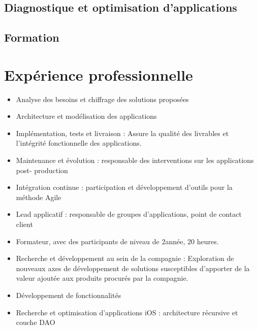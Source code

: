 \documentclass[a4paper,11pt]{moderncv}
\begin{document}
\subsection{Diagnostique et optimisation d’applications}

\subsection{Formation}

\section{Expérience professionnelle}

{}{}{}{
\begin{itemize}
	\item Analyse des besoins et chiffrage des solutions proposées
	\item Architecture et modélisation des applications
	\item Implémentation, tests et livraison : Assure la qualité des livrables et l’intégrité
fonctionnelle des applications.
	\item Maintenance et évolution : responsable des interventions sur les applications post-
production
	\item Intégration continue : participation et développement d’outils pour la méthode Agile
	\item Lead applicatif : responsable de groupes d’applications, point de contact client
	\item Formateur, avec des participants de niveau de 2\ieme année, 20 heures.
	\item Recherche et développement au sein de la compagnie : Exploration de nouveaux axes de développement de solutions susceptibles d’apporter de la valeur ajoutée aux produits
procurés par la compagnie.
\end{itemize}
}

{}{}{}{
\begin{itemize}
	\item Développement de fonctionnalités
	\item Recherche et optimisation d’applications iOS : architecture récursive et couche DAO
\end{itemize}
}
\end{document}

